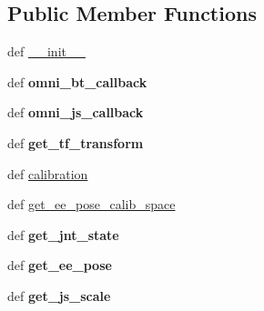 \subsection*{Public Member Functions}
\begin{DoxyCompactItemize}
\item 
def \hyperlink{classomni__interface_1_1phantom__omni_1_1_phantom_omni_aee5680ba83b5e740bf60b87d4c82ea00}{\-\_\-\-\_\-init\-\_\-\-\_\-}
\item 
\hypertarget{classomni__interface_1_1phantom__omni_1_1_phantom_omni_a8397e0e1921c559f9121fe525a552f75}{def {\bfseries omni\-\_\-bt\-\_\-callback}}\label{classomni__interface_1_1phantom__omni_1_1_phantom_omni_a8397e0e1921c559f9121fe525a552f75}

\item 
\hypertarget{classomni__interface_1_1phantom__omni_1_1_phantom_omni_ade23decdaad1c4d0de43ea79eed4b0f8}{def {\bfseries omni\-\_\-js\-\_\-callback}}\label{classomni__interface_1_1phantom__omni_1_1_phantom_omni_ade23decdaad1c4d0de43ea79eed4b0f8}

\item 
\hypertarget{classomni__interface_1_1phantom__omni_1_1_phantom_omni_a73e2754df57cd6b140eb2ff914fe4688}{def {\bfseries get\-\_\-tf\-\_\-transform}}\label{classomni__interface_1_1phantom__omni_1_1_phantom_omni_a73e2754df57cd6b140eb2ff914fe4688}

\item 
def \hyperlink{classomni__interface_1_1phantom__omni_1_1_phantom_omni_a9ae42f7021c247c15297dec2dcc7bb69}{calibration}
\item 
def \hyperlink{classomni__interface_1_1phantom__omni_1_1_phantom_omni_ab87c3156cca46923bbb8a7c71f38f71d}{get\-\_\-ee\-\_\-pose\-\_\-calib\-\_\-space}
\item 
\hypertarget{classomni__interface_1_1phantom__omni_1_1_phantom_omni_ae5f6337bedc3eb06d9821b3447e0906d}{def {\bfseries get\-\_\-jnt\-\_\-state}}\label{classomni__interface_1_1phantom__omni_1_1_phantom_omni_ae5f6337bedc3eb06d9821b3447e0906d}

\item 
\hypertarget{classomni__interface_1_1phantom__omni_1_1_phantom_omni_a2a2ac61477c2503ad06aeffbe2274293}{def {\bfseries get\-\_\-ee\-\_\-pose}}\label{classomni__interface_1_1phantom__omni_1_1_phantom_omni_a2a2ac61477c2503ad06aeffbe2274293}

\item 
\hypertarget{classomni__interface_1_1phantom__omni_1_1_phantom_omni_a005277784a771ec83be8d0e170903308}{def {\bfseries get\-\_\-js\-\_\-scale}}\label{classomni__interface_1_1phantom__omni_1_1_phantom_omni_a005277784a771ec83be8d0e170903308}


\end{DoxyCompactItemize}
